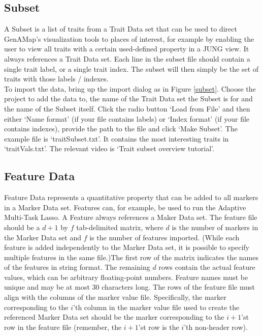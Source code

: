 \documentclass{article}
\begin{document}
\subsection{Subset}

A Subset is a list of traits from a Trait Data set that can be used to direct GenAMap's visualization tools to places of interest, for example by enabling the user to view all traits with a certain used-defined property in a JUNG view. It always references a Trait Data set. Each line in the subset file should contain a single trait label, or a single trait index. The subset will then simply be the set of traits with those labels / indexes.\\

To import the data, bring up the import dialog as in Figure \ref{subset}. Choose the project to add the data to, the name of the Trait Data set the Subset is for and the name of the Subset itself. Click the radio button `Load from File' and then either `Name format' (if your file contains labels) or `Index format' (if your file contains indexes), provide the path to the file and click `Make Subset'. The example file is `traitSubset.txt'. It contains the most interesting traits in `traitVals.txt'. The relevant video is `Trait subset overview tutorial'.

\subsection{Feature Data}

Feature Data represents a quantitative property that can be added to all markers in a Marker Data set. Features can, for example, be used to run the Adaptive Multi-Task Lasso. A Feature always references a Maker Data set. The feature file should be a $d+1$ by $f$ tab-delimited matrix, where $d$ is the number of markers in the Marker Data set and $f$ is the number of features imported. (While each feature is added independently to the Marker Data set, it is possible to specify multiple features in the same file.)The first row of the matrix indicates the names of the features in string format. The remaining $d$ rows contain the actual feature values, which can be arbitrary floating-point numbers. Feature names must be unique and may be at most 30 characters long. The rows of the feature file must align with the columns of the marker value file. Specifically, the marker corresponding to the $i$'th column in the marker value file used to create the referenced Marker Data set should be the marker corresponding to the $i+1$'st row in the feature file (remember, the $i+1$'st row is the $i$'th non-header row).\\
\end{document}
